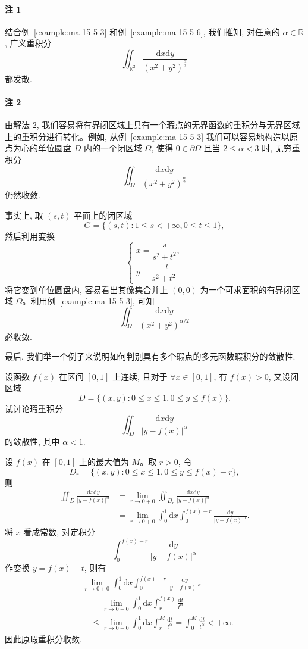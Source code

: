 \paragraph*{注 1}
结合例~\ref{example:ma-15-5-3} 和例~\ref{example:ma-15-5-6}, 我们推知, 对任意的 $\alpha\in\mathbb R$, 广义重积分
\[
  \iint_{\mathbb R^2}\frac{\mathrm dx\mathrm dy}{(x^2+y^2)^{\frac\alpha2}}
\]
都发散.

\paragraph*{注 2}
由解法 2, 我们容易将有界闭区域上具有一个瑕点的无界函数的重积分与无界区域上的重积分进行转化。例如, 从例~\ref{example:ma-15-5-3} 我们可以容易地构造以原点为心的单位圆盘 $D$ 内的一个闭区域 $\Omega$, 使得 $0\in\partial\Omega$ 且当 $2\leqslant\alpha<3$ 时, 无穷重积分
\[
  \iint_\Omega\frac{\mathrm dx\mathrm dy}{(x^2+y^2)^{\frac\alpha2}}
\]
仍然收敛.

事实上, 取 $(s,t)$ 平面上的闭区域
\[
  G=\{(s,t):1\leqslant s<+\infty,0\leqslant t\leqslant1\},
\]
然后利用变换
\[
  \begin{cases}
    x=\dfrac{s}{s^2+t^2},\\
    y=\dfrac{-t}{s^2+t^2}
  \end{cases}
\]
将它变到单位圆盘内, 容易看出其像集合并上 $(0,0)$ 为一个可求面积的有界闭区域 $\Omega$。利用例~\ref{example:ma-15-5-3}, 可知
\[
  \iint_\Omega\frac{\mathrm dx\mathrm dy}{(x^2+y^2)^{\alpha/2}}
\]
必收敛.

最后, 我们举一个例子来说明如何判别具有多个瑕点的多元函数瑕积分的敛散性.

\begin{example}\label{example:ma-15-5-7}
设函数 $f(x)$ 在区间 $[0,1]$ 上连续, 且对于 $\forall x\in[0,1]$, 有 $f(x)>0$, 又设闭区域
\[
  D=\{(x,y):0\leqslant x\leqslant1,0\leqslant y\leqslant f(x)\}.
\]
试讨论瑕重积分
\[
  \iint_D\frac{\mathrm dx\mathrm dy}{|y-f(x)|^\alpha}
\]
的敛散性, 其中 $\alpha<1$.
\end{example}


\begin{solve}
设 $f(x)$ 在 $[0,1]$ 上的最大值为 $M$。取 $r>0$, 令
\[
  D_r=\{(x,y):0\leqslant x\leqslant1,0\leqslant y\leqslant f(x)-r\},
\]
则
\[
\begin{aligned}
  \iint_D\frac{\mathrm dx\mathrm dy}{|y-f(x)|^\alpha}
  &=\lim_{r\to0+0}\iint_{D_r}\frac{\mathrm dx\mathrm dy}{|y-f(x)|^\alpha}\\
  &=\lim_{r\to0+0}\int_0^1\mathrm dx\int_0^{f(x)-r}
  \frac{\mathrm dy}{|y-f(x)|^\alpha}.
\end{aligned}
\]
将 $x$ 看成常数, 对定积分
\[
  \int_0^{f(x)-r}\frac{\mathrm dy}{|y-f(x)|^\alpha}
\]
作变换 $y=f(x)-t$, 则有
\[
\begin{aligned}
  &\lim_{r\to0+0}\int_0^1\mathrm dx\int_0^{f(x)-r}
  \frac{\mathrm dy}{|y-f(x)|^\alpha}\\
  &\quad=\lim_{r\to0+0}\int_0^1\mathrm dx\int_r^{f(x)}\frac{\mathrm dt}{t^\alpha}\\
  &\quad\leqslant\lim_{r\to0+0}\int_0^1\mathrm dx\int_r^M\frac{\mathrm dt}{t^\alpha}
  =\int_0^M\frac{\mathrm dt}{t^\alpha}<+\infty.
\end{aligned}
\]
因此原瑕重积分收敛.
\end{solve}

